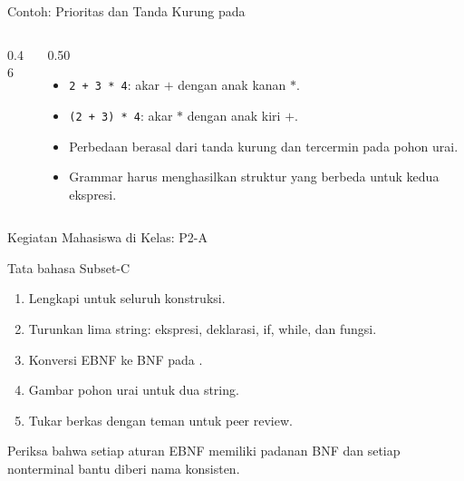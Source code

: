 \documentclass[aspectratio=169,10pt,t]{beamer}
\begin{document}
\begin{frame}[fragile]{Contoh: Prioritas dan Tanda Kurung pada }
  \begin{columns}[T,onlytextwidth]
    \begin{column}{0.46\textwidth}
      
    \end{column}
    \begin{column}{0.50\textwidth}
      \begin{itemize}
        \item \texttt{2 + 3 * 4}: akar \(+\) dengan anak kanan \(*\).
        \item \texttt{(2 + 3) * 4}: akar \(*\) dengan anak kiri \(+\).
        \item Perbedaan berasal dari tanda kurung dan tercermin pada
              pohon urai.
        \item Grammar harus menghasilkan struktur yang berbeda untuk
              kedua ekspresi.
      \end{itemize}
    \end{column}
  \end{columns}
\end{frame}

\begin{frame}{Kegiatan Mahasiswa di Kelas: P2-A}
  \begin{block}{Tata bahasa Subset-C}
    \footnotesize
    \begin{enumerate}
      \setlength{\itemsep}{1pt}
      \item Lengkapi  untuk seluruh konstruksi.
      \item Turunkan lima string: ekspresi, deklarasi, if, while, dan
            fungsi.
      \item Konversi EBNF ke BNF pada .
      \item Gambar pohon urai untuk dua string.
      \item Tukar berkas dengan teman untuk peer review.
    \end{enumerate}
  \end{block}

  \vspace{4pt}
  {\footnotesize\color{ubbblue!80}Periksa bahwa setiap aturan EBNF
  memiliki padanan BNF dan setiap nonterminal bantu diberi nama
  konsisten.}
\end{frame}
\end{document}
